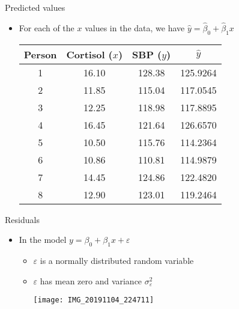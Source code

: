 \documentclass[xcolor=dvipsnames]{beamer}
\begin{document}
\begin{frame}{Predicted values}
	\begin{itemize}
		\item For each of the $x$ values in the data, we have $\hat{y} = \hat{\beta}_0 + \hat{\beta}_1 x$ \pause
		\vspace{1mm}
		\begin{center}
			\begin{tabular}{cccc}
				\hline
				Person& Cortisol ($x$) & SBP ($y$)  & $\hat{y}$ \\ 
				\hline
				1 & 16.10 & 128.38  & 125.9264\\ 
				2 & 11.85 & 115.04  & 117.0545\\ 
				3 & 12.25 & 118.98  & 117.8895\\ 
				4 & 16.45 & 121.64  & 126.6570\\ 
				5 & 10.50 & 115.76  & 114.2364\\ 
				6 & 10.86 & 110.81  & 114.9879\\ 
				7 & 14.45 & 124.86  & 122.4820\\ 
				8 & 12.90 & 123.01  & 119.2464 \\ 
				\hline
			\end{tabular}
		\end{center}
	\end{itemize}
\end{frame}
      
\begin{frame}{Residuals}
	\begin{itemize}
		\item In the model $y = \beta_0 + \beta_1 x + \varepsilon$ 
		\begin{itemize}
			\item $\varepsilon$ is a normally distributed random variable
			\item $\varepsilon$ has mean zero and variance $\sigma^2_{\varepsilon}$
			\vspace{1mm}
			\begin{center}
				\texttt{[image: IMG\_20191104\_224711]}
			\end{center}
		\end{itemize} 
	\end{itemize}
\end{frame}
\end{document}
